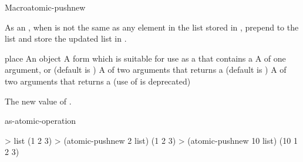 \begin{functiondoc}{Macro}{atomic-pushnew}{ 
     
    \returns{} }
%

\fnsyntax

\fnpurpose As an , when  is not
the same as any element in the list stored in , prepend
 to the list and store the updated list in .

\fnpackage {}

\fnmodule {}

\fnargs
\begin{args}{place}
\arg[item] An object
\arg[place] A form which is suitable for use as a
 that contains a  
\arg[key] A  of one argument, or \nil{} (default is \nil)
\arg[test] A  of two arguments that returns a
 (default is ) 
 A  of two arguments that returns a
 (use of  is deprecated)
\end{args}

\fnreturns The new value of . 

\begin{alsos}{as-atomic-operation}
\end{alsos}

\fnexamples
%
\W\supp
\begin{example}
> list
(1 2 3)
> (atomic-pushnew 2 list)
(1 2 3)
> (atomic-pushnew 10 list)
(10 1 2 3)
\end{example}

\end{functiondoc}


